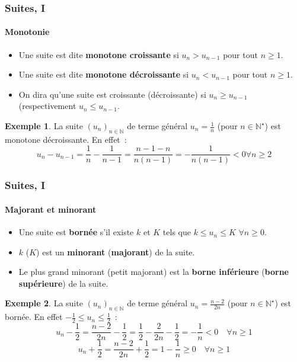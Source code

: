 \documentclass[10pt,notheorems]{beamer}
\theoremstyle{plain}
\theoremstyle{definition} %
\newtheorem{example}{Exemple}
\begin{document}
\begin{frame}
  \frametitle{Suites, I}
  \framesubtitle{Monotonie}
  \hypertarget{slide_suites_3}{}

  \begin{itemize}

  \item Une suite est dite \textbf{monotone croissante} si $u_n>u_{n-1}$ pour tout $n\geq 1$.\newline

  \item Une suite est dite \textbf{monotone décroissante} si $u_n<u_{n-1}$ pour tout $n\geq 1$.\newline

  \item On dira qu'une suite est croissante (décroissante) si $u_n\geq u_{n-1}$ (respectivement $u_n\leq u_{n-1}$.\newline

  \end{itemize}

  \begin{example}
    La suite $(u_n)_{n\in\mathbb N}$ de terme général $u_n = \frac{1}{n}$ (pour $n\in\mathbb N^{\star}$) est monotone décroissante. En effet~:
    \[
      u_n - u_{n-1} = \frac{1}{n}-\frac{1}{n-1} = \frac{n-1-n}{n(n-1)} = -\frac{1}{n(n-1)}<0 \forall n\geq 2
    \]
  \end{example}

\end{frame}


\begin{frame}
  \frametitle{Suites, I}
  \framesubtitle{Majorant et minorant}
  \hypertarget{slide_suites_4}{}

  \begin{itemize}

  \item Une suite est \textbf{bornée} s'il existe $k$ et $K$ tels que $k\leq u_n\leq K$ $\forall n\geq 0$.\newline

  \item $k$ ($K$) est un \textbf{minorant} (\textbf{majorant}) de la suite.\newline

  \item Le plus grand minorant (petit majorant) est la \textbf{borne inférieure} (\textbf{borne supérieure}) de la suite.\newline

  \end{itemize}

  \begin{example}
    La suite $(u_n)_{n\in\mathbb N}$ de terme général $u_n = \frac{n-2}{2n}$ (pour $n\in\mathbb N^{\star}$) est bornée. En effet $-\frac{1}{2}\leq u_n\leq \frac{1}{2}$~:
    \[
      u_n - \frac{1}{2} =  \frac{n-2}{2n}-\frac{1}{2}=\frac{1}{2}-\frac{2}{2n}-\frac{1}{2}=-\frac{1}{n}<0 \quad\forall n\geq 1
    \]
    \[
      u_n+\frac{1}{2} = \frac{n-2}{2n}+\frac{1}{2} = 1 - \frac{1}{n} \geq 0\quad \forall n\geq 1
    \]
  \end{example}

\end{frame}
\end{document}
